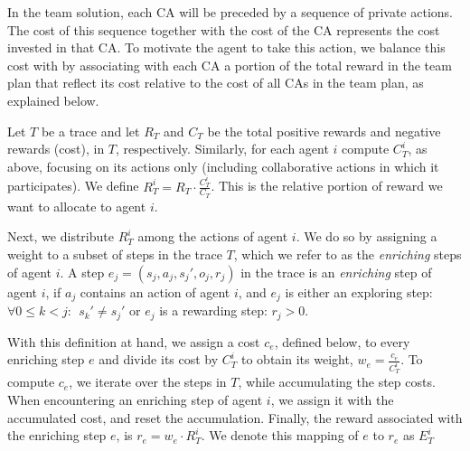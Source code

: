 \documentclass[letterpaper]{article}
\theoremstyle{definition}
\newcommand{\eliran}[1]{\textbf{[\color{red}ELIRAN:#1]}}
\newcommand{\ronen}[1]{\textbf{[\color{blue}RONEN:#1]}}
\begin{document}
In the team solution, each CA will be preceded by a sequence of private actions. The cost of this sequence together with the cost of the CA represents the cost invested in that CA. To motivate the agent to take this action, we balance this cost with by associating with each CA a portion of the total reward in the team plan that reflect its cost relative to the cost of all CAs in the team plan, as explained below.

Let $T$ be a trace and let $R_{T}$ and $C_{T}$ be the total positive rewards and negative rewards (cost),
in $T$, respectively.
Similarly, for each agent $i$ compute $C_T^i$, as above, focusing on its actions only (including collaborative actions in which it participates).
We define $R_T^i = R_T \cdot \frac{C_T^i}{C_T}$. This is the relative portion of reward we want to allocate to agent $i$. 


%
%
Next, we distribute $R_T^i$ among the actions of agent $i$. 
We do so by assigning a weight to a subset of steps in the trace $T$, which we refer to as the \emph{enriching} steps of agent $i$. A step $e_j=(s_j,a_j,s_j',o_j,r_j)$ in the trace is an \emph{enriching} step of agent $i$, if $a_j$ contains an action of agent $i$, and $e_j$ is 
either an exploring step:  $\forall 0 \leq k < j:\ \  s_k' \neq s_j'$ or $e_j$ is a rewarding step: $r_j>0$.

With this definition at hand, we assign a cost $c_e$,
defined below, to every enriching step $e$ and divide its cost by $C_T^i$ to obtain its weight, $w_e=\frac{c_e}{C_T^i}$.
To compute $c_e$, we iterate over the steps in $T$, while accumulating the step costs. When encountering an enriching step of agent $i$, we assign it with the accumulated cost, and reset the accumulation. 
Finally, the reward associated with the 
enriching step $e$, is $r_e = w_e \cdot R_T^i$. We denote this mapping of $e$ to $r_e$ as $E_T^i$
\end{document}

